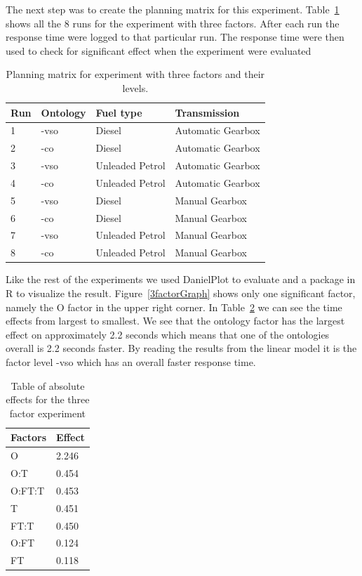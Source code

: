 \documentclass{llncs}
\begin{document}
The next step was to create the planning matrix for this
experiment. Table~\ref{3factor} shows all the 8 runs for the
experiment with three factors.  After each run the response time were
logged to that particular run. The response time were then used to
check for significant effect when the experiment were evaluated
\begin{table}
    \begin{tabular}{ | l | l l l |}
    \hline
    {\bf Run} & {\bf Ontology} & {\bf Fuel type} & {\bf Transmission} \\ \hline
	1 & -vso & Diesel & Automatic Gearbox \\ \hline 
	2 & -co & Diesel & Automatic Gearbox \\ \hline 
	3 & -vso & Unleaded Petrol & Automatic Gearbox \\ \hline 
	4 & -co & Unleaded Petrol & Automatic Gearbox \\ \hline 
	5 & -vso & Diesel & Manual Gearbox \\ \hline 
	6 & -co & Diesel & Manual Gearbox \\ \hline 
	7 & -vso & Unleaded Petrol & Manual Gearbox \\ \hline 
	8 & -co & Unleaded Petrol & Manual Gearbox \\ \hline 
    \end{tabular}
    \caption{Planning matrix for experiment with three factors and
      their levels.}\label{3factor}
\end{table}


Like the rest of the experiments we used DanielPlot to evaluate and a
package in R to visualize the result. Figure~\ref{3factorGraph}
shows only one significant factor, namely the \textsf{O} factor in the
upper right corner. In Table~\ref{3factorEffect}
we can see the time effects from largest to smallest.  We see that the
ontology factor has the largest effect on approximately 2.2 seconds
which means that one of the ontologies overall is 2.2 seconds
faster. By reading the results from the linear model it is the factor
level \textsf{-vso} which has an overall faster response time.

\begin{table}
    \begin{tabular}{ | l l |}
    \hline
    {\bf Factors} & {\bf Effect}  \\ \hline
	  O     & 2.246\\ \hline
	  O:T    &0.454 \\ \hline
	  O:FT:T &0.453 \\ \hline
	  T      &0.451 \\ \hline
	  FT:T   &0.450 \\ \hline
	  O:FT   &0.124 \\ \hline
	  FT     &0.118 \\ \hline
    \end{tabular}
\caption{Table of absolute effects for the three factor experiment}\label{3factorEffect}
\end{table} 
\end{document}
